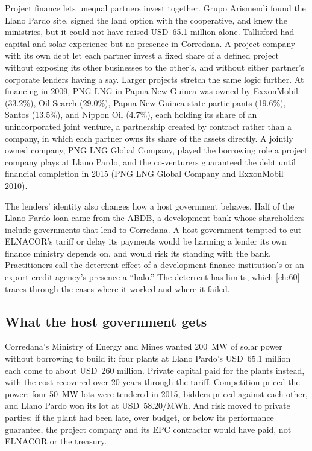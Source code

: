 Project finance lets unequal partners invest together. Grupo Arismendi found the Llano Pardo site, signed the land option with the cooperative, and knew the ministries, but it could not have raised USD~65.1 million alone. Tallisford had capital and solar experience but no presence in Corredana. A project company with its own debt let each partner invest a fixed share of a defined project without exposing its other businesses to the other's, and without either partner's corporate lenders having a say. Larger projects stretch the same logic further. At financing in 2009, PNG LNG in Papua New Guinea was owned by ExxonMobil (33.2\%), Oil Search (29.0\%), Papua New Guinea state participants (19.6\%), Santos (13.5\%), and Nippon Oil (4.7\%), each holding its share of an unincorporated joint venture, a partnership created by contract rather than a company, in which each partner owns its share of the assets directly. A jointly owned company, PNG LNG Global Company, played the borrowing role a project company plays at Llano Pardo, and the co-venturers guaranteed the debt until financial completion in 2015 (PNG LNG Global Company and ExxonMobil 2010).

The lenders' identity also changes how a host government behaves. Half of the Llano Pardo loan came from the ABDB, a development bank whose shareholders include governments that lend to Corredana. A host government tempted to cut ELNACOR's tariff or delay its payments would be harming a lender its own finance ministry depends on, and would risk its standing with the bank. Practitioners call the deterrent effect of a development finance institution's or an export credit agency's presence a ``halo.'' The deterrent has limits, which \cref{ch:60} traces through the cases where it worked and where it failed.

\subsection{What the host government gets}\label{ssec:2.5.4}

Corredana's Ministry of Energy and Mines wanted 200~MW of solar power without borrowing to build it: four plants at Llano Pardo's USD~65.1 million each come to about USD~260 million. Private capital paid for the plants instead, with the cost recovered over 20 years through the tariff. Competition priced the power: four 50~MW lots were tendered in 2015, bidders priced against each other, and Llano Pardo won its lot at USD~58.20/MWh. And risk moved to private parties: if the plant had been late, over budget, or below its performance guarantee, the project company and its EPC contractor would have paid, not ELNACOR or the treasury.

